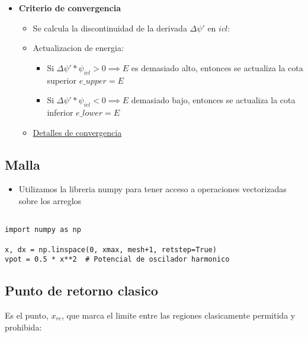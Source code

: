 \documentclass[11pt]{article}
\begin{document}
\begin{itemize}
\item \textbf{Criterio de convergencia}

\begin{itemize}
\item Se calcula la discontinuidad de la derivada \(\Delta \psi'\) en \(icl\):

\item Actualizacion de energia:
\begin{itemize}
\item Si \(\Delta \psi' * \psi_{icl} > 0 \implies E\) es demasiado alto, entonces se actualiza la cota superior \(e\_upper = E\)
\item Si \(\Delta \psi' * \psi_{icl} < 0 \implies E\) demasiado bajo, entonces se actualiza la cota inferior \(e\_lower = E\)
\end{itemize}

\item \hyperref[sec:org3d7ba66]{Detalles de convergencia}
\end{itemize}
\end{itemize}
\subsection{Malla}
\label{sec:orgd400a5e}

\begin{itemize}
\item Utilizamos la libreria numpy para tener acceso a operaciones vectorizadas sobre los arreglos
\end{itemize}

\begin{verbatim}

import numpy as np

x, dx = np.linspace(0, xmax, mesh+1, retstep=True)
vpot = 0.5 * x**2  # Potencial de oscilador harmonico

\end{verbatim}
\subsection{Punto de retorno clasico}
\label{sec:org17422d4}

Es el punto, \(x_{rc}\), que marca el limite entre las regiones clasicamente permitida y prohibida:
\end{document}
